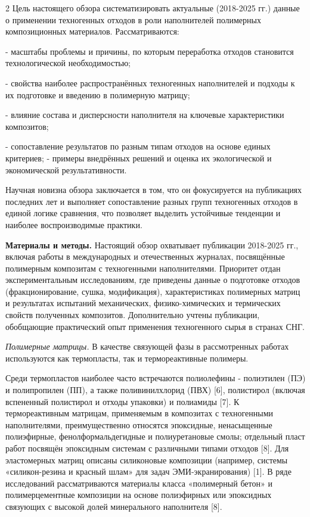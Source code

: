 \begin{multicols}{2}
Цель настоящего обзора систематизировать актуальные (2018-2025 гг.)
данные о применении техногенных отходов в роли наполнителей полимерных
композиционных материалов. Рассматриваются:

- масштабы проблемы и причины, по которым переработка отходов становится
технологической необходимостью;

- свойства наиболее распространённых техногенных наполнителей и подходы
к их подготовке и введению в полимерную матрицу;

- влияние состава и дисперсности наполнителя на ключевые характеристики
композитов;

- сопоставление результатов по разным типам отходов на основе единых
критериев; - примеры внедрённых решений и оценка их экологической и
экономической результативности.

Научная новизна обзора заключается в том, что он фокусируется на
публикациях последних лет и выполняет сопоставление разных групп
техногенных отходов в единой логике сравнения, что позволяет выделить
устойчивые тенденции и наиболее воспроизводимые практики.

{\bfseries Материалы и методы.} Настоящий обзор охватывает публикации
2018-2025 гг., включая работы в международных и отечественных журналах,
посвящённые полимерным композитам с техногенными наполнителями.
Приоритет отдан экспериментальным исследованиям, где приведены данные о
подготовке отходов (фракционирование, сушка, модификация),
характеристиках полимерных матриц и результатах испытаний механических,
физико-химических и термических свойств полученных композитов.
Дополнительно учтены публикации, обобщающие практический опыт применения
техногенного сырья в странах СНГ.

\emph{Полимерные матрицы.} В качестве связующей фазы в рассмотренных
работах используются как термопласты, так и термореактивные полимеры.

Среди термопластов наиболее часто встречаются полиолефины - полиэтилен
(ПЭ) и полипропилен (ПП), а также поливинилхлорид (ПВХ) {[}6{]},
полистирол (включая вспененный полистирол и отходы упаковки) и полиамиды
{[}7{]}. К термореактивным матрицам, применяемым в композитах с
техногенными наполнителями, преимущественно относятся эпоксидные,
ненасыщенные полиэфирные, фенолформальдегидные и полиуретановые смолы;
отдельный пласт работ посвящён эпоксидным системам с различными типами
отходов {[}8{]}. Для эластомерных матриц описаны силиконовые композиции
(например, системы «силикон-резина и красный шлам» для задач
ЭМИ-экранирования) {[}1{]}. В ряде исследований рассматриваются
материалы класса «полимерный бетон» и полимерцементные композиции на
основе полиэфирных или эпоксидных связующих с высокой долей минерального
наполнителя {[}8{]}.


\end{multicols}
